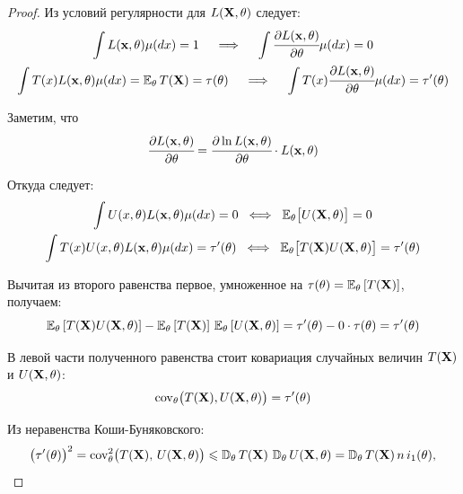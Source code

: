 \begin{proof}
    Из условий регулярности для $L(\mathbf{X}, \theta)$ следует:
    \begin{gather*}
        \int L(\mathbf{x}, \theta) \mu(d x)=1 
        \quad \implies \quad
        \int \cfrac{\partial L(\mathbf{x}, \theta)}{\partial \theta} \mu(d x)=0 \\
        \int T(x) L(\mathbf{x}, \theta) \mu(d x)=\operatorname{\operatorname{\mathbb{E}}_{\theta}} T(\mathbf{X})=\tau(\theta) 
        \quad \implies \quad
        \int T(x) \cfrac{\partial L(\mathbf{x}, \theta)}{\partial \theta} \mu(d x)=\tau'(\theta)
    \end{gather*}

    Заметим, что
    \begin{equation*}
        \cfrac{\partial L(\mathbf{x}, \theta)}{\partial \theta}=\cfrac{\partial \ln L(\mathbf{x}, \theta)}{\partial \theta} \cdot L(\mathbf{x}, \theta)
    \end{equation*}

    Откуда следует:
    \begin{gather*}
        \int U(x, \theta) L(\mathbf{x}, \theta) \mu(d x) = 0 \; \iff \; \operatorname{\operatorname{\mathbb{E}}_{\theta}} \bigl[U(\mathbf{X}, \theta)\bigr]=0 \\
        \int T(x) U(x, \theta) L(\mathbf{x}, \theta) \mu(d x) = \tau'(\theta) \; \iff \; \operatorname{\operatorname{\mathbb{E}}_{\theta}} \bigl[ T(\mathbf{X}) U(\mathbf{X}, \theta) \bigr] = \tau'(\theta)
    \end{gather*}

    Вычитая из второго равенства первое, умноженное на $\tau(\theta) = \operatorname{\operatorname{\mathbb{E}}_{\theta}} \left[ T(\mathbf{X}) \right]$, получаем:
    \begin{equation*}
        \operatorname{\operatorname{\mathbb{E}}_{\theta}}\left[T(\mathbf{X}) U(\mathbf{X}, \theta)\right] - \operatorname{\operatorname{\mathbb{E}}_{\theta}}\left[T(\mathbf{X})\right] \, \operatorname{\operatorname{\mathbb{E}}_{\theta}}\left[U(\mathbf{X}, \theta)\right] = 
        \tau'(\theta) - 0 \cdot \tau(\theta) = 
        \tau'(\theta)
    \end{equation*}

    В левой части полученного равенства стоит ковариация случайных величин $T(\mathbf{X})$ и $U(\mathbf{X},\theta)$:
    \begin{equation*}
        \operatorname{cov}_{\theta}\bigl(T(\mathbf{X}), U(\mathbf{X}, \theta)\bigr)=\tau'(\theta)
    \end{equation*}

    Из неравенства Коши-Буняковского:
    \begin{equation*}
        \bigl(\tau'(\theta)\bigr)^{2}=\operatorname{cov}_{\theta}^{2} \bigl(T(\mathbf{X}), \, U(\mathbf{X}, \theta)\bigr) \leqslant 
        \operatorname{\mathbb{D}_{\theta}} T(\mathbf{X}) \,\operatorname{\mathbb{D}_{\theta}} U(\mathbf{X}, \theta) = 
        \operatorname{\mathbb{D}_{\theta}} T(\mathbf{X}) \, n \, i_1(\theta),
    \end{equation*}


\end{proof}
